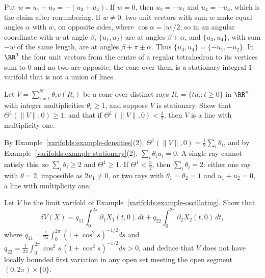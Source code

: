 \begin{solution}
Put $w = u_1 + u_2 = -(u_3 + u_4)$. If $w = 0$, then $u_2 = -u_1$ and $u_4 = -u_3$, which is the claim after renumbering. If $w \neq 0$: two unit vectors with sum $w$ make equal angles $\alpha$ with $w$, on
opposite sides, where $\cos\alpha = |w|/2$; so in an angular coordinate with $w$ at angle $\beta$, $\{u_1, u_2\}$ are at angles $\beta \pm \alpha$, and $\{u_3, u_4\}$, with sum $-w$ of the same length, are at
angles $\beta + \pi \pm \alpha$. Thus $\{u_3, u_4\} = \{-u_1, -u_2\}$. In $\RR^3$ the four unit vectors from the centre of a regular tetrahedron to its vertices sum to $0$ and no two are opposite; the cone
over them is a stationary integral $1$-varifold that is not a union of lines.
\end{solution}

\begin{exercise}\label{varifolds:exercise-density-cones}
Let $V = \sum_{i=1}^N\theta_iv(R_i)$ be a cone over distinct rays $R_i = \{tu_i : t \geq 0\}$ in $\RR^n$ with integer multiplicities $\theta_i \geq 1$, and suppose $V$ is stationary. Show that
$\Theta^1(\|V\|, 0) \geq 1$, and that if $\Theta^1(\|V\|, 0) < \frac32$, then $V$ is a line with multiplicity one.
\end{exercise}

\begin{solution}
By Example~\ref{varifolds:example-densities}(2), $\Theta^1(\|V\|, 0) = \frac12\sum_i\theta_i$, and by Example~\ref{varifolds:example-stationary}(2), $\sum_i\theta_iu_i = 0$. A single ray cannot satisfy this, so
$\sum_i\theta_i \geq 2$ and $\Theta^1 \geq 1$. If $\Theta^1 < \frac32$, then $\sum_i\theta_i = 2$: either one ray with $\theta = 2$, impossible as $2u_1 \neq 0$, or two rays with $\theta_1 = \theta_2 = 1$ and
$u_1 + u_2 = 0$, a line with multiplicity one.
\end{solution}

\begin{exercise}\label{varifolds:exercise-oscillating-variation}
Let $V$ be the limit varifold of Example~\ref{varifolds:example-oscillating}. Show that
\[
\delta V(X) = q_{11}\int_0^{2\pi}\partial_1X_1(t, 0)\,dt + q_{22}\int_0^{2\pi}\partial_2X_2(t, 0)\,dt,
\]
where
$q_{11} = \frac1{2\pi}\int_0^{2\pi}(1 + \cos^2s)^{-1/2}ds$ and $q_{22} = \frac1{2\pi}\int_0^{2\pi}\cos^2s\,(1 + \cos^2s)^{-1/2}ds > 0$, and deduce that $V$ does not have locally bounded first variation in
any open set meeting the open segment $(0, 2\pi) \times \{0\}$.
\end{exercise}

